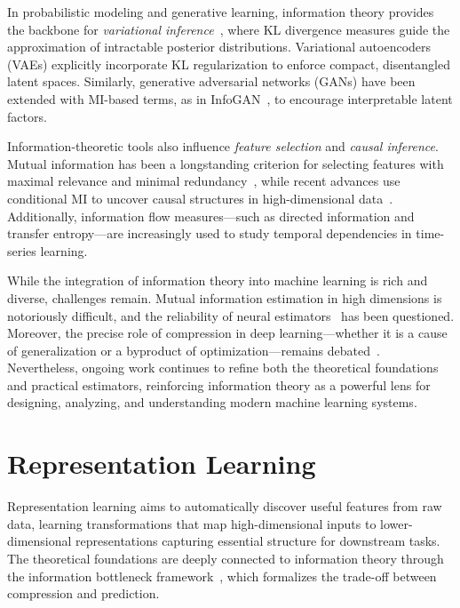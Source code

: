 \documentclass[11pt, oneside]{book}
\theoremstyle{plain}
\theoremstyle{definition}
\theoremstyle{remark}
\begin{document}
In probabilistic modeling and generative learning, information theory provides the backbone for \emph{variational inference}~\citep{jordan1999introduction,kingma2014auto}, where KL divergence measures guide the approximation of intractable posterior distributions. Variational autoencoders (VAEs) explicitly incorporate KL regularization to enforce compact, disentangled latent spaces. Similarly, generative adversarial networks (GANs) have been extended with MI-based terms, as in InfoGAN~\citep{chen2016infogan}, to encourage interpretable latent factors.

Information-theoretic tools also influence \emph{feature selection} and \emph{causal inference}. Mutual information has been a longstanding criterion for selecting features with maximal relevance and minimal redundancy~\cite{peng2005feature}, while recent advances use conditional MI to uncover causal structures in high-dimensional data~\cite{runge2019detecting}. Additionally, information flow measures—such as directed information and transfer entropy—are increasingly used to study temporal dependencies in time-series learning.

While the integration of information theory into machine learning is rich and diverse, challenges remain. Mutual information estimation in high dimensions is notoriously difficult, and the reliability of neural estimators~\cite{belghazi2018mutual} has been questioned. Moreover, the precise role of compression in deep learning—whether it is a cause of generalization or a byproduct of optimization—remains debated~\cite{saxe2019information}. Nevertheless, ongoing work continues to refine both the theoretical foundations and practical estimators, reinforcing information theory as a powerful lens for designing, analyzing, and understanding modern machine learning systems.


\section{Representation Learning}

Representation learning aims to automatically discover useful features from raw data, learning transformations that map high-dimensional inputs to lower-dimensional representations capturing essential structure for downstream tasks. The theoretical foundations are deeply connected to information theory through the information bottleneck framework~\citep{tishby2000information}, which formalizes the trade-off between compression and prediction.
\end{document}
